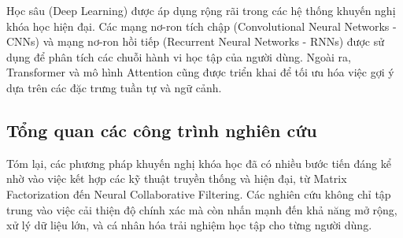 Học sâu (Deep Learning) được áp dụng rộng rãi trong các hệ thống khuyến nghị khóa học hiện đại. Các mạng nơ-ron tích chập (Convolutional Neural Networks - CNNs) và mạng nơ-ron hồi tiếp (Recurrent Neural Networks - RNNs) được sử dụng để phân tích các chuỗi hành vi học tập của người dùng. Ngoài ra, Transformer và mô hình Attention cũng được triển khai để tối ưu hóa việc gợi ý dựa trên các đặc trưng tuần tự và ngữ cảnh.

\subsection{Tổng quan các công trình nghiên cứu}

Tóm lại, các phương pháp khuyến nghị khóa học đã có nhiều bước tiến đáng kể nhờ vào việc kết hợp các kỹ thuật truyền thống và hiện đại, từ Matrix Factorization đến Neural Collaborative Filtering. Các nghiên cứu không chỉ tập trung vào việc cải thiện độ chính xác mà còn nhấn mạnh đến khả năng mở rộng, xử lý dữ liệu lớn, và cá nhân hóa trải nghiệm học tập cho từng người dùng.
